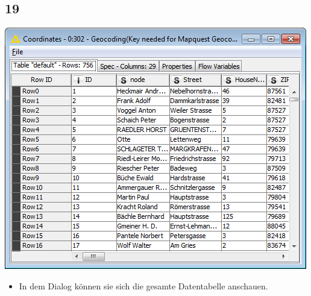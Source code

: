 \documentclass{beamer}
\begin{document}
\subsection{19}
\begin{frame}
	\begin{center}
  		\includegraphics[height=0.6\textheight]{19.png}
	\end{center}
	\begin{itemize}
		\item In dem Dialog können sie sich die gesamte Datentabelle anschauen.
	\end{itemize}
\end{frame}
\end{document}
